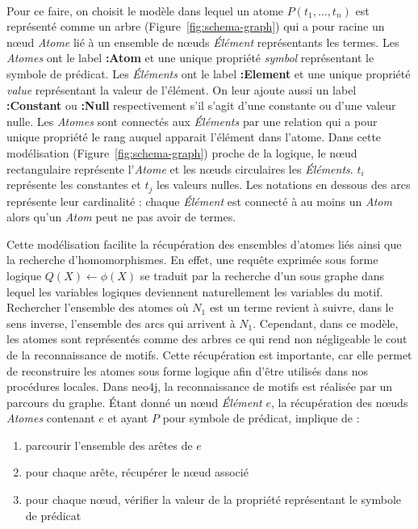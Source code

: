 \paragraph{}
Pour ce faire, on choisit le modèle dans lequel un atome $P(t_1, \dots, t_n)$ est représenté comme un arbre (Figure~\ref{fig:schema-graph}) qui a pour racine un nœud \textit{Atome} lié à un ensemble de nœuds \textit{Élément} représentants les termes.
Les \textit{Atomes} ont le label \textbf{:Atom} et une unique propriété \emph{symbol} représentant le symbole de prédicat.
Les \textit{Éléments} ont le label \textbf{:Element} et une unique propriété \emph{value} représentant la valeur de l'élément.
On leur ajoute aussi un label \textbf{:Constant} ou \textbf{:Null} respectivement s'il s'agit d'une constante ou d'une valeur nulle.
Les \textit{Atomes} sont connectés aux \textit{Éléments} par une relation qui a pour unique propriété le rang auquel apparait l'élément dans l'atome.
Dans cette modélisation (Figure~\ref{fig:schema-graph}) proche de la logique, le nœud rectangulaire représente l'\textit{Atome} et les nœuds circulaires les \textit{Éléments}.
$t_i$ représente les constantes et $t_j$ les valeurs nulles.
Les notations en dessous des arcs représente leur cardinalité : chaque \textit{Élément} est connecté à au moins un \textit{Atom} alors qu'un \textit{Atom} peut ne pas avoir de termes.


Cette modélisation facilite la récupération des ensembles d'atomes liés ainsi que la recherche d'homomorphismes.
En effet, une requête exprimée sous forme logique $Q(X) \gets \phi(X)$ se traduit par la recherche d'un sous graphe dans lequel les variables logiques deviennent naturellement les variables du motif.
Rechercher l'ensemble des atomes où $N_1$ est un terme revient à suivre, dans le sens inverse, l'ensemble des arcs qui arrivent à $N_1$.
Cependant, dans ce modèle, les atomes sont représentés comme des arbres ce qui rend non négligeable le cout de la reconnaissance de motifs.
Cette récupération est importante, car elle permet de reconstruire les atomes sous forme logique afin d'être utilisés dans nos procédures locales.
Dans \gls{neo4j}, la reconnaissance de motifs est réalisée par un parcours du graphe.
Étant donné un nœud \textit{Élément} $e$, la récupération des nœuds \textit{Atomes} contenant $e$ et ayant $P$ pour symbole de prédicat, implique de :

\begin{enumerate}
    \item parcourir l'ensemble des arêtes de $e$
    \item pour chaque arête, récupérer le nœud associé
    \item pour chaque nœud, vérifier la valeur de la propriété représentant le symbole de prédicat
\end{enumerate}


